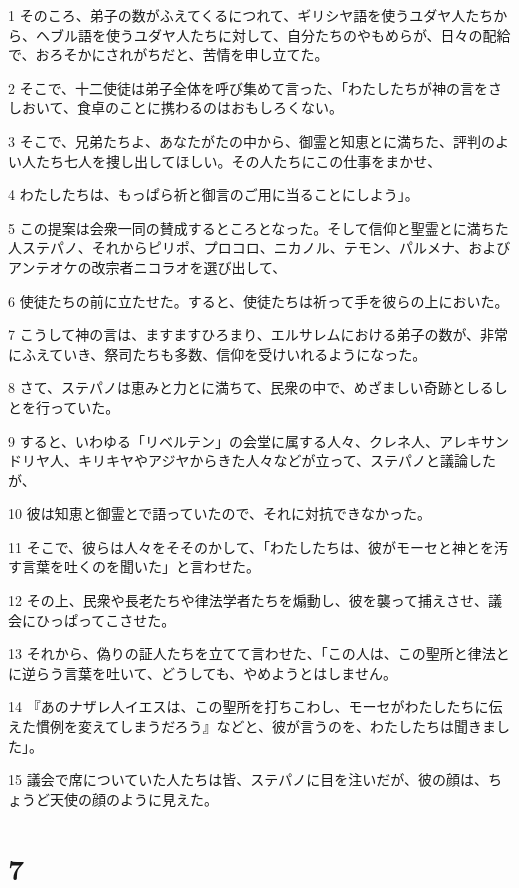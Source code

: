 \par 1 そのころ、弟子の数がふえてくるにつれて、ギリシヤ語を使うユダヤ人たちから、ヘブル語を使うユダヤ人たちに対して、自分たちのやもめらが、日々の配給で、おろそかにされがちだと、苦情を申し立てた。
\par 2 そこで、十二使徒は弟子全体を呼び集めて言った、「わたしたちが神の言をさしおいて、食卓のことに携わるのはおもしろくない。
\par 3 そこで、兄弟たちよ、あなたがたの中から、御霊と知恵とに満ちた、評判のよい人たち七人を捜し出してほしい。その人たちにこの仕事をまかせ、
\par 4 わたしたちは、もっぱら祈と御言のご用に当ることにしよう」。
\par 5 この提案は会衆一同の賛成するところとなった。そして信仰と聖霊とに満ちた人ステパノ、それからピリポ、プロコロ、ニカノル、テモン、パルメナ、およびアンテオケの改宗者ニコラオを選び出して、
\par 6 使徒たちの前に立たせた。すると、使徒たちは祈って手を彼らの上においた。
\par 7 こうして神の言は、ますますひろまり、エルサレムにおける弟子の数が、非常にふえていき、祭司たちも多数、信仰を受けいれるようになった。
\par 8 さて、ステパノは恵みと力とに満ちて、民衆の中で、めざましい奇跡としるしとを行っていた。
\par 9 すると、いわゆる「リベルテン」の会堂に属する人々、クレネ人、アレキサンドリヤ人、キリキヤやアジヤからきた人々などが立って、ステパノと議論したが、
\par 10 彼は知恵と御霊とで語っていたので、それに対抗できなかった。
\par 11 そこで、彼らは人々をそそのかして、「わたしたちは、彼がモーセと神とを汚す言葉を吐くのを聞いた」と言わせた。
\par 12 その上、民衆や長老たちや律法学者たちを煽動し、彼を襲って捕えさせ、議会にひっぱってこさせた。
\par 13 それから、偽りの証人たちを立てて言わせた、「この人は、この聖所と律法とに逆らう言葉を吐いて、どうしても、やめようとはしません。
\par 14 『あのナザレ人イエスは、この聖所を打ちこわし、モーセがわたしたちに伝えた慣例を変えてしまうだろう』などと、彼が言うのを、わたしたちは聞きました」。
\par 15 議会で席についていた人たちは皆、ステパノに目を注いだが、彼の顔は、ちょうど天使の顔のように見えた。

\chapter{7}

